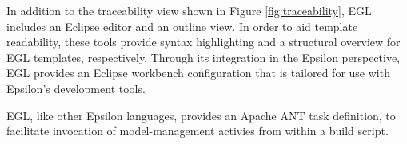 In addition to the traceability view shown in Figure
\ref{fig:traceability}, EGL includes an Eclipse editor and an outline
view. In order to aid template readability, these tools provide syntax 
highlighting and a structural overview for EGL templates, respectively. Through its 
integration in the Epsilon perspective, EGL provides an Eclipse workbench 
configuration that is tailored for use with Epsilon's development tools.


EGL, like other Epsilon languages, provides an Apache ANT
task definition, to facilitate invocation of model-management activies
from within a build script.